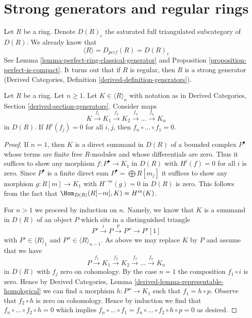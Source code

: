 \section{Strong generators and regular rings}
\label{section-strong-generators-regular}

\noindent
Let $R$ be a ring. Denote $D(R)_c$ the saturated full triangulated subcategory
of $D(R)$. We already know that
$$
\langle R \rangle = D_{perf}(R) = D(R)_c
$$
See Lemma \ref{lemma-perfect-ring-classical-generator}
and Proposition \ref{proposition-perfect-is-compact}.
It turns out that if $R$ is regular, then $R$ is a strong generator
(Derived Categories, Definition \ref{derived-definition-generators}).

\begin{lemma}
\label{lemma-ghost-lemma}
\begin{reference}
\cite{Kelly}
\end{reference}
Let $R$ be a ring. Let $n \geq 1$. Let $K \in \langle R \rangle_n$ with
notation as in Derived Categories, Section \ref{derived-section-generators}.
Consider maps
$$
K \xrightarrow{f_1} K_1 \xrightarrow{f_2} K_2
\xrightarrow{f_3} \ldots \xrightarrow{f_n} K_n
$$
in $D(R)$. If $H^i(f_j) = 0$ for all $i, j$, then
$f_n \circ \ldots \circ f_1 = 0$.
\end{lemma}

\begin{proof}
If $n = 1$, then $K$ is a direct summand in $D(R)$ of a bounded complex
$P^\bullet$ whose terms are finite free $R$-modules and whose differentials
are zero. Thus it suffices to show any morphism $f : P^\bullet \to K_1$
in $D(R)$ with $H^i(f) = 0$ for all $i$ is zero. Since $P^\bullet$ is
a finite direct sum $P^\bullet = \bigoplus R[m_j]$ it suffices to show
any morphism $g : R[m] \to K_1$ with $H^{-m}(g) = 0$ in $D(R)$ is zero.
This follows from the fact that $\Hom_{D(R)}(R[-m], K) = H^m(K)$.

\medskip\noindent
For $n > 1$ we proceed by induction on $n$. Namely, we know that $K$
is a summand in $D(R)$ of an object $P$ which sits in a distinguished triangle
$$
P' \xrightarrow{i} P \xrightarrow{p} P'' \to P'[1]
$$
with $P' \in \langle R \rangle_1$ and $P'' \in \langle R \rangle_{n - 1}$.
As above we may replace $K$ by $P$ and assume that we have
$$
P \xrightarrow{f_1} K_1 \xrightarrow{f_2} K_2
\xrightarrow{f_3} \ldots \xrightarrow{f_n} K_n
$$
in $D(R)$ with $f_j$ zero on cohomology.
By the case $n = 1$ the composition $f_1 \circ i$ is zero.
Hence by Derived Categories, Lemma \ref{derived-lemma-representable-homological}
we can find a morphism $h : P'' \to K_1$ such that $f_1 = h \circ p$.
Observe that $f_2 \circ h$ is zero on cohomology.
Hence by induction we find that $f_n \circ \ldots \circ f_2 \circ h = 0$
which implies $f_n \circ \ldots \circ f_1 = 
f_n \circ \ldots \circ f_2 \circ h \circ p = 0$ as desired.
\end{proof}

